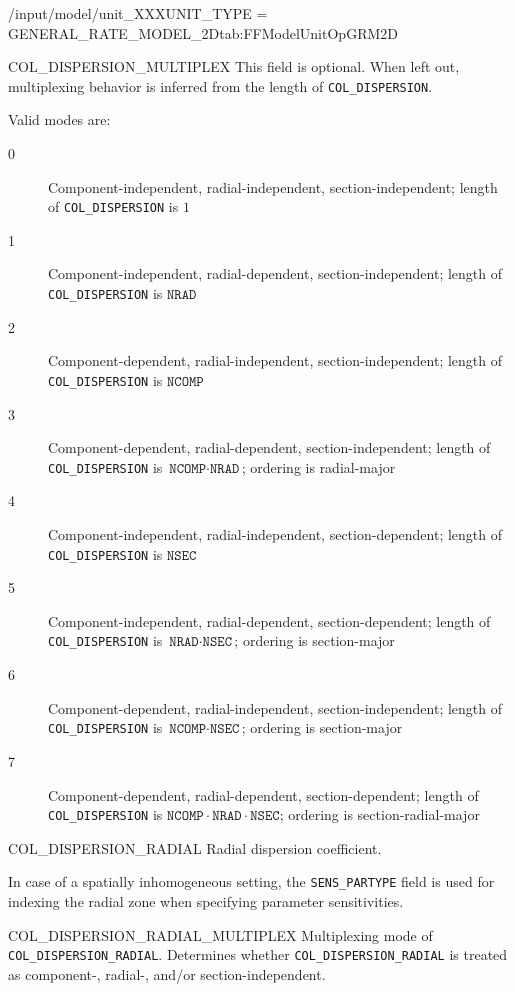 \begin{condsubgroup}{/input/model/unit\_XXX}{UNIT\_TYPE = GENERAL\_RATE\_MODEL\_2D}{tab:FFModelUnitOpGRM2D}
\begin{dataset}[unit=--,type=int,range={$\{0, \dots, 7 \}$},length={1}]{COL\_DISPERSION\_MULTIPLEX}
    This field is optional.
    When left out, multiplexing behavior is inferred from the length of \texttt{COL\_DISPERSION}.

    Valid modes are:
    \begin{description}
      \item[0] Component-independent, radial-independent, section-independent; length of \texttt{COL\_DISPERSION} is $1$
      \item[1] Component-independent, radial-dependent, section-independent; length of \texttt{COL\_DISPERSION} is $\texttt{NRAD}$
      \item[2] Component-dependent, radial-independent, section-independent; length of \texttt{COL\_DISPERSION} is $\texttt{NCOMP}$
      \item[3] Component-dependent, radial-dependent, section-independent; length of \texttt{COL\_DISPERSION} is $\texttt{NCOMP} \cdot \texttt{NRAD}$; ordering is radial-major
      \item[4] Component-independent, radial-independent, section-dependent; length of \texttt{COL\_DISPERSION} is $\texttt{NSEC}$
      \item[5] Component-independent, radial-dependent, section-dependent; length of \texttt{COL\_DISPERSION} is $\texttt{NRAD} \cdot \texttt{NSEC}$; ordering is section-major
      \item[6] Component-dependent, radial-independent, section-independent; length of \texttt{COL\_DISPERSION} is $\texttt{NCOMP} \cdot \texttt{NSEC}$; ordering is section-major
      \item[7] Component-dependent, radial-dependent, section-dependent; length of \texttt{COL\_DISPERSION} is $\texttt{NCOMP} \cdot \texttt{NRAD} \cdot \texttt{NSEC}$; ordering is section-radial-major
    \end{description}\vspace{-\baselineskip}
  \end{dataset}
  \begin{dataset}[unit=\si{\square\metre\of{IV}\per\second},type=double,range={$\geq 0$},length={see \texttt{COL\_DISPERSION\_RADIAL\_MULTIPLEX}}]{COL\_DISPERSION\_RADIAL}
    Radial dispersion coefficient.

    In case of a spatially inhomogeneous setting, the \texttt{SENS\_PARTYPE} field is used for indexing the radial zone when specifying parameter sensitivities.
  \end{dataset}
  \begin{dataset}[unit=--,type=int,range={$\{0, \dots, 7 \}$},length={1}]{COL\_DISPERSION\_RADIAL\_MULTIPLEX}
    Multiplexing mode of \texttt{COL\_DISPERSION\_RADIAL}.
    Determines whether \texttt{COL\_DISPERSION\_RADIAL} is treated as component-, radial-, and/or section-independent.


\end{dataset}
\end{condsubgroup}
